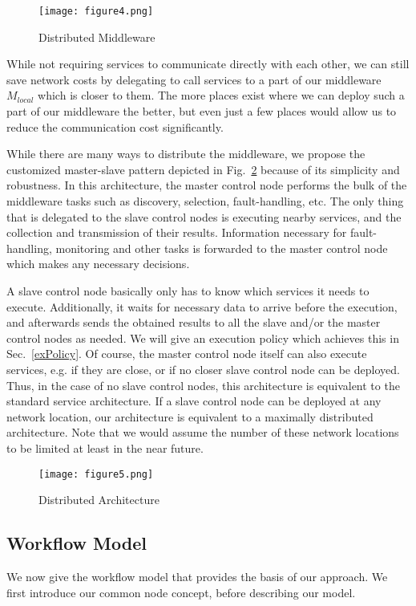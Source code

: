 \documentclass[10pt, conference, compsocconf]{IEEEtran}
\newcommand{\oneImage}{3.2in}
\newcommand{\twoImages}{1.6in}
\begin{document}
\begin{figure}[htb!]
	\centering
	\texttt{[image: figure4.png]}
	\caption{Distributed Middleware}
	\label{fig:distributed_middleware}
\end{figure}

\noindent While not requiring services to communicate directly with each other,
	we can still save network costs by delegating to call services to a part of our middleware $M_{local}$ which is closer to them.
The more places exist where we can deploy such a part of our middleware the better,
	but even just a few places would allow us to reduce the communication cost significantly.

While there are many ways to distribute the middleware,
	we propose the customized master-slave pattern depicted in Fig.~\ref{fig:distributed_architecture}
		because of its simplicity and robustness.
In this architecture, the master control node performs the bulk of the middleware tasks
	such as discovery, selection, fault-handling, etc.
The only thing that is delegated to the slave control nodes is executing nearby services,
	and the collection and transmission of their results.
Information necessary for fault-handling, monitoring and other tasks is forwarded to the master control node
	which makes any necessary decisions.

A slave control node basically only has to know which services it needs to execute.
Additionally, it waits for necessary data to arrive before the execution,
	and afterwards sends the obtained results to all the slave and/or the master control nodes as needed.
We will give an execution policy which achieves this in Sec.~\ref{exPolicy}.
Of course, the master control node itself can also execute services, e.g. if they are close,
	or if no closer slave control node can be deployed.
Thus, in the case of no slave control nodes,	this architecture is equivalent to the standard service architecture.
If a slave control node can be deployed at any network location,
	our architecture is equivalent to a maximally distributed architecture.
Note that we would assume the number of these network locations to be limited at least in the near future.

\begin{figure}[htb!]
  \centering
	\texttt{[image: figure5.png]}
	\caption{Distributed Architecture}
	\label{fig:distributed_architecture}
\end{figure}

\subsection{Workflow Model}
\noindent We now give the workflow model that provides the basis of our approach.
We first introduce our common node concept, before describing our model.
\end{document}
